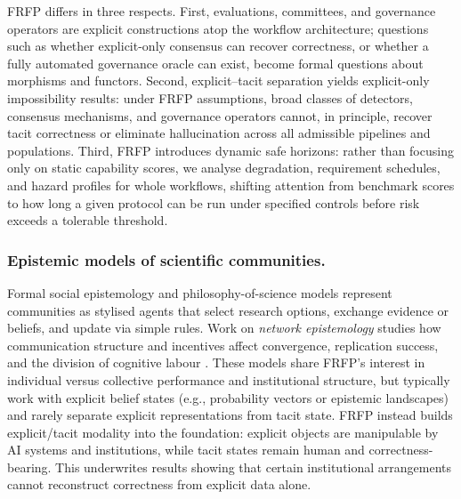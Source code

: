 \documentclass[preprints,accept]{Definitions/mdpi}
\theoremstyle{definition}
\begin{document}
FRFP differs in three respects. First, evaluations, committees, and governance operators are explicit constructions atop the workflow architecture; questions such as whether explicit-only consensus can recover correctness, or whether a fully automated governance oracle can exist, become formal questions about morphisms and functors. Second, explicit--tacit separation yields explicit-only impossibility results: under FRFP assumptions, broad classes of detectors, consensus mechanisms, and governance operators cannot, in principle, recover tacit correctness or eliminate hallucination across all admissible pipelines and populations. Third, FRFP introduces dynamic safe horizons: rather than focusing only on static capability scores, we analyse degradation, requirement schedules, and hazard profiles for whole workflows, shifting attention from benchmark scores to how long a given protocol can be run under specified controls before risk exceeds a tolerable threshold.

\subsubsection{Epistemic models of scientific communities.}
Formal social epistemology and philosophy-of-science models represent communities as stylised agents that select research options, exchange evidence or beliefs, and update via simple rules. Work on \emph{network epistemology} studies how communication structure and incentives affect convergence, replication success, and the division of cognitive labour \cite{Zollman2013Network,Grim2013ScientificNetworks}. These models share FRFP's interest in individual versus collective performance and institutional structure, but typically work with explicit belief states (e.g., probability vectors or epistemic landscapes) and rarely separate explicit representations from tacit state. FRFP instead builds explicit/tacit modality into the foundation: explicit objects are manipulable by AI systems and institutions, while tacit states remain human and correctness-bearing. This underwrites results showing that certain institutional arrangements cannot reconstruct correctness from explicit data alone.
\end{document}
